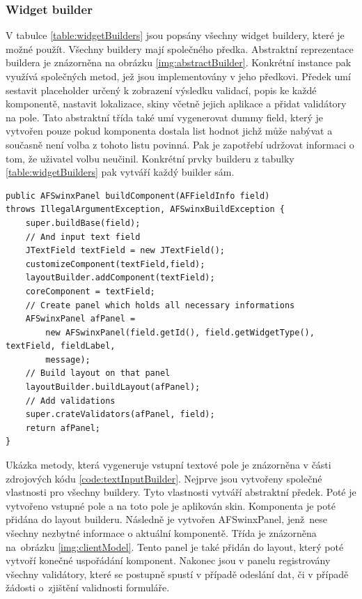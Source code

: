 \subsubsection{Widget builder}
V tabulce \ref{table:widgetBuilders} jsou popsány všechny widget buildery, které je možné použít. Všechny buildery mají společného předka. Abstraktní reprezentace buildera je znázorněna na obrázku \ref{img:abstractBuilder}. Konkrétní instance pak využívá společných metod, jež jsou implementovány v jeho předkovi. Předek umí sestavit placeholder určený k zobrazení výsledku validací, popis ke každé komponentě, nastavit lokalizace, skiny včetně jejich aplikace a přidat validátory na pole. Tato abstraktní třída také umí vygenerovat dummy field, který je vytvořen pouze pokud komponenta dostala list hodnot jichž může nabývat a současně není volba z tohoto listu povinná. Pak je zapotřebí udržovat informaci o tom, že uživatel volbu neučinil. Konkrétní prvky builderu z tabulky \ref{table:widgetBuilders} pak vytváří každý builder sám. 

\begin{lstlisting}[caption={Vytváření vstupního pole builderem.},
label={code:textInputBuilder}, basicstyle=\footnotesize]
public AFSwinxPanel buildComponent(AFFieldInfo field) 
throws IllegalArgumentException, AFSwinxBuildException {
	super.buildBase(field);
	// And input text field
	JTextField textField = new JTextField();
	customizeComponent(textField,field);
	layoutBuilder.addComponent(textField);
	coreComponent = textField;
	// Create panel which holds all necessary informations
	AFSwinxPanel afPanel =
		new AFSwinxPanel(field.getId(), field.getWidgetType(), textField, fieldLabel,
		message);
	// Build layout on that panel
	layoutBuilder.buildLayout(afPanel);
	// Add validations
	super.crateValidators(afPanel, field);
	return afPanel;
}
\end{lstlisting}

Ukázka metody, která vygeneruje vstupní textové pole je znázorněna v části zdrojových kódu \ref{code:textInputBuilder}. Nejprve jsou vytvořeny společné vlastnosti pro všechny buildery. Tyto vlastnosti vytváří abstraktní předek. Poté je vytvořeno vstupné pole a na toto pole je aplikován skin. Komponenta je poté přidána do layout builderu. Následně je vytvořen AFSwinxPanel, jenž~nese všechny nezbytné informace o aktuální komponentě. Třída je znázorněna na~obrázku \ref{img:clientModel}. Tento panel je také přidán do layout, který poté vytvoří konečné uspořádání komponent. Nakonec jsou v panelu registrovány všechny validátory, které se postupně spustí v případě odeslání dat, či v případě žádosti o~zjištění validnosti formuláře.

